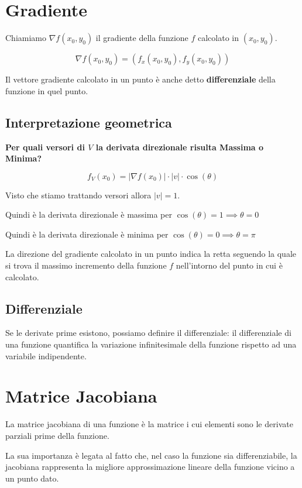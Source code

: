 \section{Gradiente}

Chiamiamo $\nabla f(x_0,y_0)$ il gradiente della funzione $f$ calcolato in $(x_0,y_0)$.

$$ \nabla f(x_0,y_0) = (f_x(x_0,y_0),f_y(x_0,y_0))$$

Il vettore gradiente calcolato in un punto è anche detto \textbf{differenziale} della funzione in quel punto.

\subsection{Interpretazione geometrica}

\textbf{Per quali versori di $V$ la derivata direzionale risulta Massima o Minima?}

$$
f_V(x_0)  = |\nabla f(x_0)| \cdot |v| \cdot \cos(\theta)
$$

Visto che stiamo trattando versori allora $|v|=1$.

Quindi è la derivata direzionale è massima per $\cos(\theta)=1 \implies \theta=0$

Quindi è la derivata direzionale è minima per $\cos(\theta)=0 \implies \theta=\pi$

La direzione del gradiente calcolato in un punto indica la retta seguendo la quale si trova il massimo incremento della funzione $f$ nell'intorno del punto in cui è calcolato.

\subsection{Differenziale}

Se le derivate prime esistono, possiamo definire il differenziale: il differenziale di una funzione quantifica la variazione infinitesimale della funzione rispetto ad una variabile indipendente.

\section{Matrice Jacobiana}

La matrice jacobiana di una funzione è la matrice i cui elementi sono le derivate parziali prime della funzione.

La sua importanza è legata al fatto che, nel caso la funzione sia differenziabile, la jacobiana rappresenta la migliore approssimazione lineare della funzione vicino a un punto dato.


